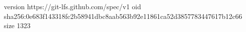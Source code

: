 version https://git-lfs.github.com/spec/v1
oid sha256:0e683f143318fc2b58941dbc8aab563b92e11861ca52d3857783447617b12c66
size 1323
